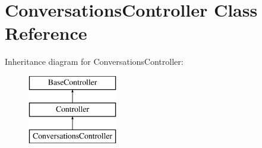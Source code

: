 \hypertarget{class_responsive_1_1_http_1_1_controllers_1_1_conversations_controller}{}\section{Conversations\+Controller Class Reference}
\label{class_responsive_1_1_http_1_1_controllers_1_1_conversations_controller}
Inheritance diagram for Conversations\+Controller\+:\begin{figure}[H]
\begin{center}
\leavevmode
\includegraphics[height=3.000000cm]{class_responsive_1_1_http_1_1_controllers_1_1_conversations_controller}
\end{center}
\end{figure}
